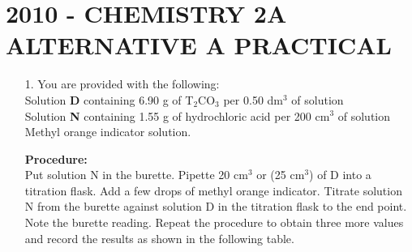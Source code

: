 \section{2010 - CHEMISTRY 2A ALTERNATIVE A PRACTICAL} 

\begin{enumerate}

\item[1.] You are provided with the following:\\
Solution \textbf{D} containing 6.90 g of T$_2$CO$_3$ per 0.50 dm$^3$ of solution\\
Solution \textbf{N} containing 1.55 g of hydrochloric acid per 200 cm$^3$ of solution\\
Methyl orange indicator solution.\\
\vspace{-6pt}

\textbf{Procedure:}\\
Put solution N in the burette. Pipette 20 cm$^3$ or (25 cm$^3$) of D into a titration flask. Add a few drops of methyl orange indicator. Titrate solution N from the burette against solution D in the titration flask to the end point. Note the burette reading. Repeat the procedure to obtain three more values and record the results as shown in the following table.\\


\end{enumerate}
